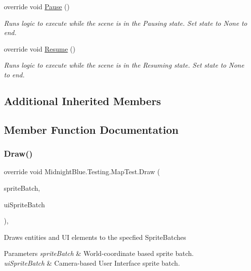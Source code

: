 \begin{DoxyCompactItemize}
override void \hyperlink{class_midnight_blue_1_1_testing_1_1_map_test_a7dba960137d634b15e4f4b7b3a86489f}{Pause} ()
\begin{DoxyCompactList}\small\item\em Runs logic to execute while the scene is in the Pausing state. Set state to None to end. \end{DoxyCompactList}\item 
override void \hyperlink{class_midnight_blue_1_1_testing_1_1_map_test_aa595402e6d3702119877721f7cb3ab9f}{Resume} ()
\begin{DoxyCompactList}\small\item\em Runs logic to execute while the scene is in the Resuming state. Set state to None to end. \end{DoxyCompactList}\end{DoxyCompactItemize}
\subsection*{Additional Inherited Members}


\subsection{Member Function Documentation}
\hypertarget{class_midnight_blue_1_1_testing_1_1_map_test_a03d0a9349662afafaa301a8581fbf01f}{}\label{class_midnight_blue_1_1_testing_1_1_map_test_a03d0a9349662afafaa301a8581fbf01f} 
\subsubsection{\texorpdfstring{Draw()}{Draw()}}
{\footnotesize\ttfamily override void Midnight\+Blue.\+Testing.\+Map\+Test.\+Draw (\begin{DoxyParamCaption}\item[{Sprite\+Batch}]{sprite\+Batch,  }\item[{Sprite\+Batch}]{ui\+Sprite\+Batch }\end{DoxyParamCaption})\hspace{0.3cm}{\ttfamily [inline]}, {\ttfamily [virtual]}}



Draws entities and UI elements to the specfied Sprite\+Batches 


\begin{DoxyParams}{Parameters}
{\em sprite\+Batch} & World-\/coordinate based sprite batch.\\
\hline
{\em ui\+Sprite\+Batch} & Camera-\/based User Interface sprite batch.\\
\hline
\end{DoxyParams}


